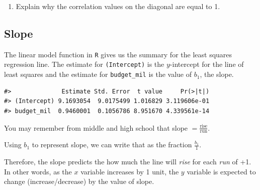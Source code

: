 \documentclass[
]{report}
\newenvironment{Shaded}{\begin{snugshade}}{\end{snugshade}}
\newcommand{\CommentTok}[1]{\textcolor[rgb]{0.56,0.35,0.01}{\textit{#1}}}
\newcommand{\DataTypeTok}[1]{\textcolor[rgb]{0.13,0.29,0.53}{#1}}
\newcommand{\KeywordTok}[1]{\textcolor[rgb]{0.13,0.29,0.53}{\textbf{#1}}}
\newcommand{\NormalTok}[1]{#1}
\newcommand{\OperatorTok}[1]{\textcolor[rgb]{0.81,0.36,0.00}{\textbf{#1}}}
\newcommand{\StringTok}[1]{\textcolor[rgb]{0.31,0.60,0.02}{#1}}
\providecommand{\tightlist}{%
  \setlength{\itemsep}{0pt}\setlength{\parskip}{0pt}}
\begin{document}
\begin{enumerate}
\def\labelenumi{\arabic{enumi}.}
\setcounter{enumi}{8}
\tightlist
\item
  Explain why the correlation values on the diagonal are equal to 1.
\end{enumerate}

\vspace{1in}

\newpage

\hypertarget{slope}{%
\subsection*{Slope}\label{slope}}

The linear model function in \texttt{R} gives us the summary for the least squares regression line. The estimate for \texttt{(Intercept)} is the \(y\)-intercept for the line of least squares and the estimate for \texttt{budget\_mil} is the value of \(b_1\), the slope.

\begin{Shaded}
\end{Shaded}

\begin{verbatim}
#>              Estimate Std. Error  t value     Pr(>|t|)
#> (Intercept) 9.1693054  9.0175499 1.016829 3.119606e-01
#> budget_mil  0.9460001  0.1056786 8.951670 4.339561e-14
\end{verbatim}

You may remember from middle and high school that slope \(=\frac{\mbox{rise}}{\mbox{run}}\).

Using \(b_1\) to represent slope, we can write that as the fraction \(\frac{b_1}{1}\).

Therefore, the slope predicts the how much the line will \emph{rise} for each \emph{run} of +1. In other words, as the \(x\) variable increases by 1 unit, the \(y\) variable is expected to change (increase/decrease) by the value of slope.
\end{document}
